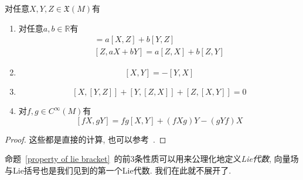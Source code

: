 \begin{prop}[Lie括号的性质]\label{property of lie bracket}
    对任意$X,Y,Z\in\mathfrak{X}(M)$有
    \begin{enumerate}[{\upshape 1.}]
        \item {} 对任意$a,b\in\mathbb{R}$有
        \begin{gather*}
            [aX+bY,Z]=a[X,Z]+b[Y,Z]\\
            [Z,aX+bY]=a[Z,X]+b[Z,Y]
        \end{gather*}
        \item {} \[[X,Y]=-[Y,X]\]
        \item {} \[[X,[Y,Z]]+[Y,[Z,X]]+[Z,[X,Y]]=0\]
        \item 对$f,g\in C^\infty(M)$有
        \[[fX,gY]=fg[X,Y]+(fXg)Y-(gYf)X\]
    \end{enumerate}
\end{prop}
\begin{proof}
    这些都是直接的计算, 也可以参考~\parencite[命题8.28]{Lee_IntroSmMani}.
\end{proof}

命题~\ref{property of lie bracket}~的前3条性质可以用来公理化地定义\textit{Lie代数}, 向量场与Lie括号也是我们见到的第一个Lie代数.
我们在此就不展开了.

